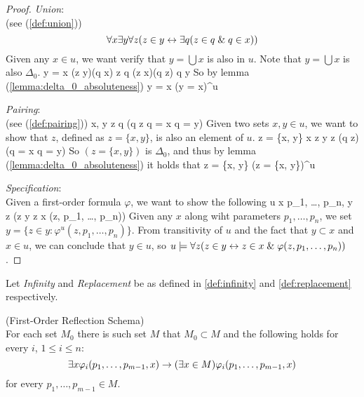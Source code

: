 \begin{proof}
\item \emph{Union}:\\
(see (\ref{def:union}))
\begin{equation}
\forall x \exists y \forall z (z \in y \leftrightarrow \exists q( z \in q \mathrel{\&} q \in x))
\end{equation}
Given any $x \in u$, we want verify that $y = \bigcup x$ is also in $u$. Note that $y = \bigcup x$ is also $\Delta_0$.
\beq
y = \bigcup x \iff (\forall z \in y)(\exists q \in x) z \in q \et (\forall z \in x)(\forall q \in z) q \in y
\eeq
So by lemma (\ref{lemma:delta_0_absoluteness})
\beq
y = \bigcup x \iff (y = \bigcup x)^u
\eeq

\item \emph{Pairing}:\\
(see (\ref{def:pairing}))
\beq
\forall x, y \exists z \forall q (q \in z \iff q = x \lor q = y)
\eeq
Given two sets $x, y \in u$, we want to show that $z$, defined as $z = \{x, y\}$, is also an element of $u$.
\beq
z = \{x, y\} \iff x \in z \et y \in z \et (\forall q \in z)(q = x \lor q = y)
\eeq
So $(z = \{x, y\})$ is $ \Delta_0 $, and thus by lemma (\ref{lemma:delta_0_absoluteness}) it holds that
\beq
z = \{x, y\} \iff (z = \{x, y\})^u
\eeq

\item \emph{Specification}: \\ %
Given a first-order formula $\varphi$, we want to show the following
\beq
u \models \forall x \forall p_1, \ldots, p_n, \exists y \forall z (z \in y \iff z \in x \et \varphi(z, p_1, \ldots, p_n))
\eeq
Given any $x$ along wiht parameters $p_1, \ldots, p_n$, we set $y = \{z \in y : \varphi^u(z, p_1, \ldots, p_n) \}$. From transitivity of $u$ and the fact that $y \subset x$ and $x \in u$, we can conclude that $y \in u$, so $u \models \forall z (z \in y \leftrightarrow z \in x \mathrel{\&} \varphi(z, p_1, \dots, p_n))$.
\ece
\end{proof}


Let \emph{Infinity} and \emph{Replacement} be as defined in \ref{def:infinity} and \ref{def:replacement} respectively.

\begin{definition}{(First-Order Reflection Schema)}\\
For each set $M_0$ there is such set $M$ that $M_0 \subset M$ and the following holds for every $i$, $1 \leq i \leq n$:
\begin{equation}\label{equation:refl_lemma_i}
\exists x \varphi_i(p_1, \ldots, p_{m-1}, x) \rightarrow (\exists x \in M) \varphi_i(p_1, \ldots, p_{m-1}, x)
\end{equation}
for every $p_1, \ldots, p_{m-1} \in M$.
\end{definition}

